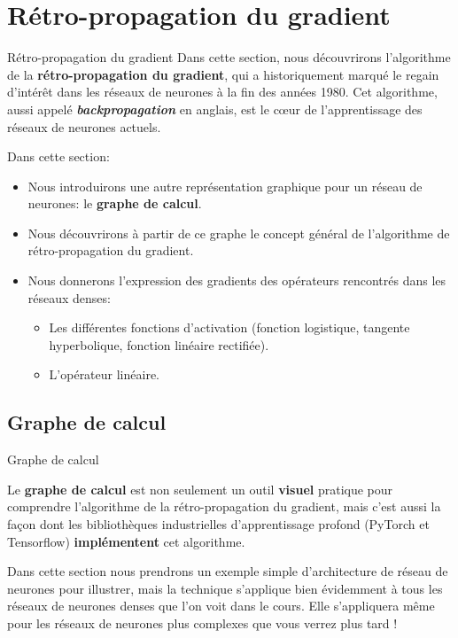\section[Rétro-propagation du gradient]{Rétro-propagation du gradient}

\begin{frame}{Rétro-propagation du gradient}
	Dans cette section, nous découvrirons l'algorithme de la \textbf{rétro-propagation du gradient}, qui a historiquement marqué le regain d'intérêt dans les réseaux de neurones à la fin des années 1980. Cet algorithme, aussi appelé \textit{\textbf{backpropagation}} en anglais, est le cœur de l'apprentissage des réseaux de neurones actuels.
	
	\pause
	\vspace{0.3cm}
	
	Dans cette section:
	\begin{itemize}
		\item Nous introduirons une autre représentation graphique pour un réseau de neurones: le \textbf{graphe de calcul}.
		\pause
		\item Nous découvrirons à partir de ce graphe le concept général de l'algorithme de rétro-propagation du gradient.
		\pause
		\item Nous donnerons l'expression des gradients des opérateurs rencontrés dans les réseaux denses:
		\begin{itemize}
			\item Les différentes fonctions d'activation (fonction logistique, tangente hyperbolique, fonction linéaire rectifiée).
			\item L'opérateur linéaire.
		\end{itemize}
	\end{itemize}
\end{frame}

\subsection[Graphe de calcul]{Graphe de calcul}

\begin{frame}{Graphe de calcul}

	Le \textbf{graphe de calcul} est non seulement un outil \textbf{visuel} pratique pour comprendre l'algorithme de la rétro-propagation du gradient, mais c'est aussi la façon dont les bibliothèques industrielles d'apprentissage profond (PyTorch et Tensorflow) \textbf{implémentent} cet algorithme.
	
	\pause
	\vspace{0.3cm}
	
	Dans cette section nous prendrons un exemple simple d'architecture de réseau de neurones pour illustrer, mais la technique s'applique bien évidemment à tous les réseaux de neurones denses que l'on voit dans le cours. Elle s'appliquera même pour les réseaux de neurones plus complexes que vous verrez plus tard !

\end{frame}

